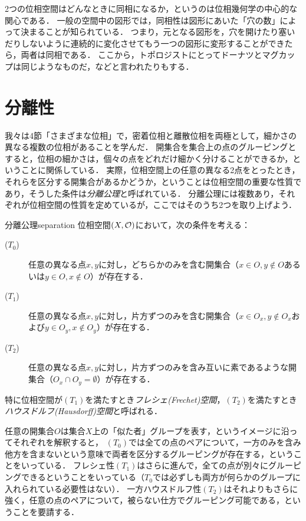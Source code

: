 \documentclass[11pt,a4paper, dvipdfmx]{jsarticle}
\begin{document}
\begin{hatten}{}{}
2つの位相空間はどんなときに同相になるか，というのは位相幾何学の中心的な関心である．
一般の空間中の図形では，同相性は図形にあいた「穴の数」によって決まることが知られている．
つまり，元となる図形を，穴を開けたり塞いだりしないように連続的に変化させてもう一つの図形に変形することができたら，両者は同相である．
ここから，トポロジストにとってドーナツとマグカップは同じようなものだ，などと言われたりもする．
\end{hatten}


\section{分離性}
我々は4節「さまざまな位相」で，密着位相と離散位相を両極として，細かさの異なる複数の位相があることを学んだ．
開集合を集合上の点のグルーピングとすると，位相の細かさは，個々の点をどれだけ細かく分けることができるか，ということに関係している．
実際，位相空間上の任意の異なる2点をとったとき，それらを区分する開集合があるかどうか，ということは位相空間の重要な性質であり，そうした条件は\emph{分離公理}と呼ばれている．
分離公理には複数あり，それぞれが位相空間の性質を定めているが，ここではそのうち2つを取り上げよう．

\begin{dfn}{分離公理}{separation}
位相空間$(X, \mathcal{O})$において，次の条件を考える：
\begin{description}
 \item[($T_0$)] 任意の異なる点$x, y$に対し，どちらかのみを含む開集合（$x \in O, y \not\in O$あるいは$y \in O, x \not\in O$）が存在する．
 \item[($T_1$)] 任意の異なる点$x, y$に対し，片方ずつのみを含む開集合（$x \in O_x, y \not\in O_x$および$y \in O_y, x \not\in O_y$）が存在する．
 \item[($T_2$)] 任意の異なる点$x, y$に対し，片方ずつのみを含み互いに素であるような開集合（$O_x \cap O_y = \emptyset$）が存在する．
\end{description} 
特に位相空間が$(T_1)$を満たすとき\emph{フレシェ(Frechet)空間}，$(T_2)$を満たすとき\emph{ハウスドルフ(Hausdorff)空間}と呼ばれる．
\end{dfn}

任意の開集合$O$は集合$X$上の「似た者」グループを表す，というイメージに沿ってそれぞれを解釈すると，
$(T_0)$では全ての点のペアについて，一方のみを含み他方を含まないという意味で両者を区分するグルーピングが存在する，ということをいっている．
フレシェ性$(T_1)$はさらに進んで，全ての点が別々にグルーピングできるということをいっている（$T_0$では必ずしも両方が何らかのグループに入れられている必要性はない）．
一方ハウスドルフ性$(T_2)$はそれよりもさらに強く，任意の点のペアについて，被らない仕方でグルーピング可能である，ということを要請する．
\end{document}
